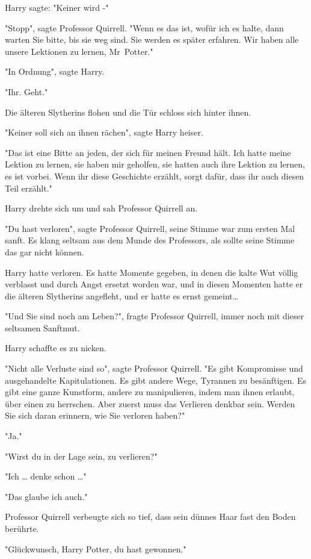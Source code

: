 {Harry sagte: "Keiner wird -"

"Stopp", sagte Professor Quirrell. "Wenn es das ist, wofür ich es halte, dann warten Sie bitte, bis sie weg sind. Sie werden es später erfahren. Wir haben alle unsere Lektionen zu lernen, Mr~Potter."

"In Ordnung", sagte Harry.

"Ihr. Geht."

Die älteren Slytherins flohen und die Tür schloss sich hinter ihnen.

"Keiner soll sich an ihnen rächen", sagte Harry heiser.

"Das ist eine Bitte an jeden, der sich für meinen Freund hält. Ich hatte meine Lektion zu lernen, sie haben mir geholfen, sie hatten auch ihre Lektion zu lernen, es ist vorbei. Wenn ihr diese Geschichte erzählt, sorgt dafür, dass ihr auch diesen Teil erzählt."

Harry drehte sich um und sah Professor Quirrell an.

"Du hast verloren", sagte Professor Quirrell, seine Stimme war zum ersten Mal sanft. Es klang seltsam aus dem Munde des Professors, als sollte seine Stimme das gar nicht können.

Harry hatte verloren. Es hatte Momente gegeben, in denen die kalte Wut völlig verblasst und durch Angst ersetzt worden war, und in diesen Momenten hatte er die älteren Slytherins angefleht, und er hatte es ernst gemeint…

"Und Sie sind noch am Leben?", fragte Professor Quirrell, immer noch mit dieser seltsamen Sanftmut.

Harry schaffte es zu nicken.

"Nicht alle Verluste sind so", sagte Professor Quirrell. "Es gibt Kompromisse und ausgehandelte Kapitulationen. Es gibt andere Wege, Tyrannen zu besänftigen. Es gibt eine ganze Kunstform, andere zu manipulieren, indem man ihnen erlaubt, über einen zu herrschen. Aber zuerst muss das Verlieren denkbar sein. Werden Sie sich daran erinnern, wie Sie verloren haben?"

"Ja."

"Wirst du in der Lage sein, zu verlieren?"

"Ich … denke schon …"

"Das glaube ich auch."

Professor Quirrell verbeugte sich so tief, dass sein dünnes Haar fast den Boden berührte.

"Glückwunsch, Harry Potter, du hast gewonnen."

}
